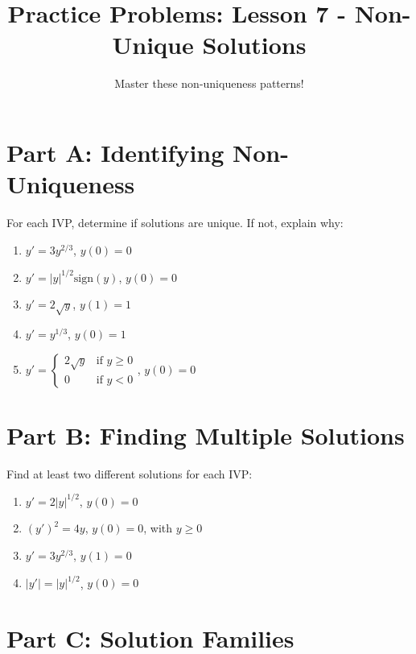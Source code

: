 \documentclass[12pt]{article}
\title{Practice Problems: Lesson 7 - Non-Unique Solutions}
\author{Master these non-uniqueness patterns!}
\date{}
\begin{document}
\maketitle

\section*{Part A: Identifying Non-Uniqueness}

For each IVP, determine if solutions are unique. If not, explain why:

\begin{enumerate}
    \item $y' = 3y^{2/3}$, $y(0) = 0$
    
    \item $y' = |y|^{1/2}\text{sign}(y)$, $y(0) = 0$
    
    \item $y' = 2\sqrt{y}$, $y(1) = 1$
    
    \item $y' = y^{1/3}$, $y(0) = 1$
    
    \item $y' = \begin{cases}
        2\sqrt{y} & \text{if } y \geq 0 \\
        0 & \text{if } y < 0
    \end{cases}$, $y(0) = 0$
\end{enumerate}

\section*{Part B: Finding Multiple Solutions}

Find at least two different solutions for each IVP:

\begin{enumerate}[start=6]
    \item $y' = 2|y|^{1/2}$, $y(0) = 0$
    
    \item $(y')^2 = 4y$, $y(0) = 0$, with $y \geq 0$
    
    \item $y' = 3y^{2/3}$, $y(1) = 0$
    
    \item $|y'| = |y|^{1/2}$, $y(0) = 0$
\end{enumerate}

\section*{Part C: Solution Families}
\end{document}
